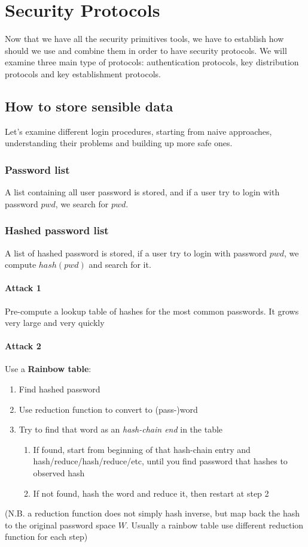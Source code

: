 \section{Security Protocols}
Now that we have all the security primitives tools, we have to establish how should we use and combine them in order to have security protocols. We will examine three main type of protocols: authentication protocols, key distribution protocols and key establishment protocols.

\subsection{How to store sensible data}
Let's examine different login procedures, starting from naive approaches, understanding their problems and building up more safe ones.

\subsubsection{Password list} A list containing all user password is stored, and if a user try to login with password $pwd$, we search for $pwd$.

\subsubsection{Hashed password list} A list of hashed password is stored, if a user try to login with password $pwd$, we compute $hash(pwd)$ and search for it.
\paragraph{Attack 1} Pre-compute a lookup table of hashes for the most common passwords. It grows very large and very quickly
\paragraph{Attack 2} Use a \textbf{Rainbow table}:
\begin{enumerate}
    \item Find hashed password
    \item Use reduction function to convert to (pass-)word
    \item Try to find that word as an \textit{hash-chain end} in the table
    \begin{enumerate}
        \item If found, start from beginning of that hash-chain entry and hash/reduce/hash/reduce/etc, until you find password that hashes to observed hash
        \item If not found, hash the word and reduce it, then restart at step 2
    \end{enumerate}
\end{enumerate}
(N.B. a reduction function does not simply hash inverse, but map back the hash to the original password space $W$. Usually a rainbow table use different reduction function for each step)

